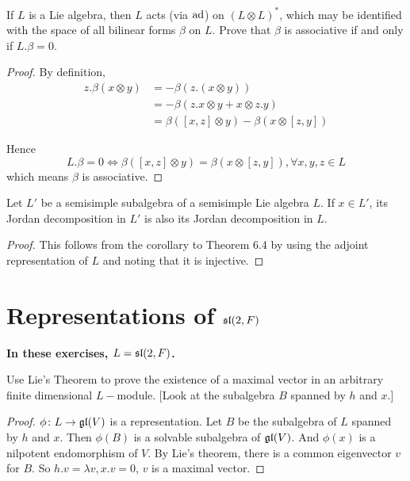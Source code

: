 \begin{ex}
  If $L$ is a Lie algebra, then $L$ acts (via $\ad$) on $(L\otimes L)^{\ast}$, which may be identified with the space of all bilinear forms $\beta$ on $L$. Prove that $\beta$ is associative if and only if $L.\beta = 0$.
\end{ex}
\begin{proof}
  By definition,
  \begin{align*}
    z.\beta(x\otimes y) &= -\beta(z.(x\otimes y)) \\
     &= -\beta(z.x\otimes y+x\otimes z.y) \\
     &= \beta([x,z]\otimes y)-\beta(x\otimes[z,y])
  \end{align*}

  Hence
  \begin{equation*}
    L.\beta=0 \iff \beta([x,z]\otimes y)=\beta(x\otimes[z,y]), \forall x,y,z\in L
  \end{equation*}
  which means $\beta$ is associative.
\end{proof}

\begin{ex}\label{6.9}
  Let $L'$ be a semisimple subalgebra of a semisimple Lie algebra $L$. If $x \in L'$, its Jordan decomposition in $L'$ is also its Jordan decomposition in $L$.
\end{ex}
\begin{proof}
  This follows from the corollary to Theorem 6.4 by using the adjoint representation of $L$ and noting that it is injective.
\end{proof}

\section{Representations of $\sl(2,F)$}
\textbf{In these exercises, $L = \sl(2,F)$.}

\begin{ex}
  Use Lie's Theorem to prove the existence of a maximal vector in an arbitrary finite dimensional $L-$module. [Look at the subalgebra $B$ spanned by $h$ and $x$.]
\end{ex}
\begin{proof}
  $\phi\colon L \to \gl(V)$ is a representation. Let $B$ be the subalgebra of $L$ spanned by $h$ and $x$. Then $\phi(B)$ is a solvable subalgebra of $\gl(V)$. And $\phi(x)$ is a nilpotent endomorphism of $V$. By Lie's theorem, there is a common eigenvector $v$ for $B$. So $h.v = \lambda v, x.v = 0$, $v$ is a maximal vector.
\end{proof}

